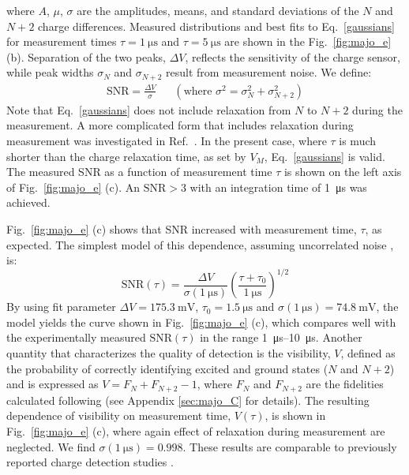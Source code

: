where $A$, $\mu$, $\sigma$ are the amplitudes, means, and standard deviations of the $N$ and $N+2$ charge differences. Measured distributions and best fits to Eq.~\eqref{gaussians} for measurement times $\tau = \SI{1}{\micro\second}$ and $\tau = \SI{5}{\micro\second}$ are shown in the Fig.~\ref{fig:majo_e} (b). Separation of the two peaks, $\Delta V$, reflects the sensitivity of the charge sensor, while peak widths $\sigma_{N}$ and $\sigma_{N+2}$ result from measurement noise. We define:
\begin{align}
	\textrm{SNR} = \frac{\Delta V}{\sigma} && (\textrm{where }\sigma^{2} = \sigma_{N}^2+\sigma_{N+2}^2)
\end{align}
Note that Eq.~\eqref{gaussians} does not include relaxation from $N$ to $N+2$ during the measurement. A more complicated form that includes relaxation during measurement was investigated in Ref.~\cite{barthel2009rapid}. In the present case, where $\tau$ is much shorter than the charge relaxation time, as set by $V_{M}$, Eq.~\eqref{gaussians} is valid. The measured SNR as a function of measurement time $\tau$ is shown on the left axis of Fig.~\ref{fig:majo_e} (c). An $\textrm{SNR} > 3$ with an integration time of \SI{1}{\micro\second} was achieved.

Fig.~\ref{fig:majo_e} (c) shows that SNR increased with measurement time, $\tau$, as expected. The simplest model of this dependence, assuming uncorrelated noise \cite{sensingdot}, is:
\begin{equation}
	\textrm{SNR}(\tau) = \frac{\Delta V}{\sigma(\SI{1}{\micro\second})}\left(\frac{\tau+\tau_{0}}{\SI{1}{\micro\second}}\right)^{1/2}
\end{equation}
By using fit parameter $\Delta V = \SI{175.3}{\milli\volt}$, $\tau_{0} = \SI{1.5}{\micro\second}$ and $\sigma(\SI{1}{\micro\second}) = \SI{74.8}{\milli\volt}$, the model yields the curve shown in Fig.~\ref{fig:majo_e} (c), which compares well with the experimentally measured $\textrm{SNR}(\tau)$ in the range \SIrange{1}{10}{\micro\second}. Another quantity that characterizes the quality of detection is the visibility, $V$, defined as the probability of correctly identifying excited and ground states ($N$ and $N+2$) and is expressed as $V = F_{N} + F_{N+2} - 1$, where $F_{N}$ and $F_{N+2}$ are the fidelities calculated following \cite{barthel2009rapid} (see Appendix \ref{sec:majo_C} for details). The resulting dependence of visibility on measurement time, $V(\tau)$, is shown in Fig.~\ref{fig:majo_e} (c), where again effect of relaxation during measurement are neglected. We find $\sigma(\SI{1}{\micro\second}) = 0.998$. These results are comparable to previously reported charge detection studies \cite{PhysRevApplied.11.044061,spin6,sens2,sens3,rf_nw2}.

